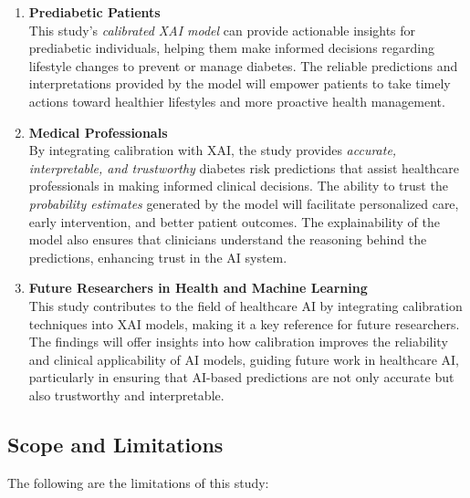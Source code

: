 \begin{enumerate}
    \item \textbf{Prediabetic Patients} \\
    This study's \textit{calibrated XAI model} can provide actionable insights for prediabetic individuals, helping them make informed decisions regarding lifestyle changes to prevent or manage diabetes. The reliable predictions and interpretations provided by the model will empower patients to take timely actions toward healthier lifestyles and more proactive health management.

    \item \textbf{Medical Professionals} \\
    By integrating calibration with XAI, the study provides \textit{accurate, interpretable, and trustworthy} diabetes risk predictions that assist healthcare professionals in making informed clinical decisions. The ability to trust the \textit{probability estimates} generated by the model will facilitate personalized care, early intervention, and better patient outcomes. The explainability of the model also ensures that clinicians understand the reasoning behind the predictions, enhancing trust in the AI system.

    \item \textbf{Future Researchers in Health and Machine Learning} \\
    This study contributes to the field of healthcare AI by integrating calibration techniques into XAI models, making it a key reference for future researchers. The findings will offer insights into how calibration improves the reliability and clinical applicability of AI models, guiding future work in healthcare AI, particularly in ensuring that AI-based predictions are not only accurate but also trustworthy and interpretable.
\end{enumerate}


\subsection{Scope and Limitations}

The following are the limitations of this study:


